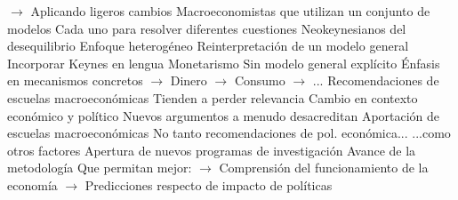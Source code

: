 \documentclass{nuevotema}
\begin{document}
\begin{esquemal}
				\4[] $\to$ Aplicando ligeros cambios
				\4 Macroeconomistas que utilizan un conjunto de modelos
				\4[] Cada uno para resolver diferentes cuestiones
				\4 Neokeynesianos del desequilibrio
				\4[] Enfoque heterogéneo
				\4[] Reinterpretación de un modelo general
				\4[] Incorporar Keynes en lengua
				\4 Monetarismo
				\4[] Sin modelo general explícito
				\4[] Énfasis en mecanismos concretos
				\4[] $\to$ Dinero
				\4[] $\to$ Consumo
				\4[] $\to$ ...
			\3 Recomendaciones de escuelas macroeconómicas
				\4 Tienden a perder relevancia
				\4[] Cambio en contexto económico y político
				\4 Nuevos argumentos a menudo desacreditan
			\3 Aportación de escuelas macroeconómicas
				\4 No tanto recomendaciones de pol. económica...
				\4[] ...como otros factores
				\4 Apertura de nuevos programas de investigación
				\4 Avance de la metodología
				\4[] Que permitan mejor:
				\4[] $\to$ Comprensión del funcionamiento de la economía
				\4[] $\to$ Predicciones respecto de impacto de políticas
\end{esquemal}































\graficas
\end{document}
